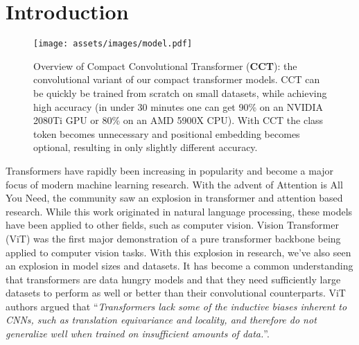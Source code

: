 \documentclass[10pt,twocolumn,letterpaper]{article}
\begin{document}
\section{Introduction}

\begin{figure}
    \centering
    \texttt{[image: assets/images/model.pdf]}
    \caption{Overview of Compact Convolutional Transformer (\textbf{CCT}): the convolutional variant of our compact transformer models. CCT can be quickly be trained from scratch on small datasets, while achieving high accuracy 
    (in under 30 minutes one can get 90\% on an NVIDIA 2080Ti GPU or 80\% on an AMD 5900X CPU).
    With CCT the class token becomes unnecessary and positional embedding becomes optional, resulting in only slightly different accuracy. 
    }
    \label{fig:method_overview}
\end{figure}

Transformers have rapidly been increasing in popularity and become a major focus of modern machine learning research. With the advent of Attention is All You Need\cite{vaswani2017attention}, the community saw an explosion in transformer and attention based research. While this work originated in natural language processing, these models have been applied to other fields, such as computer vision. 
Vision Transformer (ViT) \cite{dosovitskiy2020image} was the first major demonstration of a pure transformer backbone being applied to computer vision tasks. With this explosion in research, we've also seen an explosion in model sizes and datasets. It has become a common understanding that transformers are data hungry models and that they need sufficiently large datasets to perform as well or better than their convolutional counterparts.
ViT authors argued that ``\textit{Transformers lack some of the inductive biases inherent to CNNs, such as translation equivariance and locality, and therefore do not generalize well when trained on insufficient amounts of data.}''.
\end{document}
